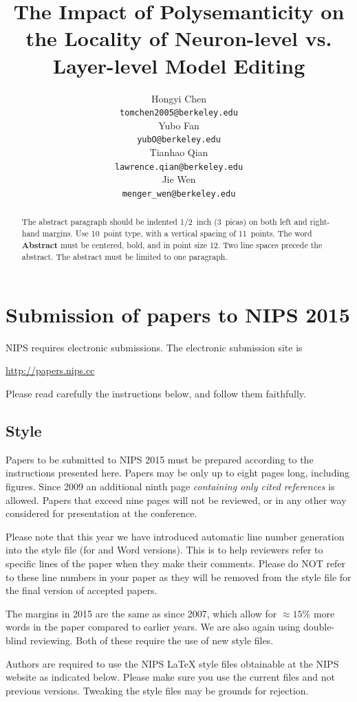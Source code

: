 \documentclass{article} %
\title{The Impact of Polysemanticity on the Locality of Neuron-level vs. Layer-level Model Editing}
\author{
Hongyi Chen \\
\texttt{tomchen2005@berkeley.edu} \\
\And
Yubo Fan \\
\texttt{yubO@berkeley.edu} \\
\AND
Tianhao Qian \\
\texttt{lawrence.qian@berkeley.edu} \\
\And
Jie Wen \\
\texttt{menger_wen@berkeley.edu} \\
}
\begin{document}
\maketitle

\begin{abstract}
The abstract paragraph should be indented 1/2~inch (3~picas) on both left and
right-hand margins. Use 10~point type, with a vertical spacing of 11~points.
The word \textbf{Abstract} must be centered, bold, and in point size 12. Two
line spaces precede the abstract. The abstract must be limited to one
paragraph.
\end{abstract}

\section{Submission of papers to NIPS 2015}

NIPS requires electronic submissions.  The electronic submission site is  
\begin{center}
   \url{http://papers.nips.cc}
\end{center}

Please read carefully the
instructions below, and follow them faithfully.
\subsection{Style}

Papers to be submitted to NIPS 2015 must be prepared according to the
instructions presented here. Papers may be only up to eight pages long,
including figures. Since 2009 an additional ninth page \textit{containing only
cited references} is allowed. Papers that exceed nine pages will not be
reviewed, or in any other way considered for presentation at the conference.

Please note that this year we have introduced automatic line number generation
into the style file (for \LaTeXe and Word versions). This is to help reviewers
refer to specific lines of the paper when they make their comments. Please do
NOT refer to these line numbers in your paper as they will be removed from the
style file for the final version of accepted papers.

The margins in 2015 are the same as since 2007, which allow for $\approx 15\%$
more words in the paper compared to earlier years. We are also again using 
double-blind reviewing. Both of these require the use of new style files.

Authors are required to use the NIPS \LaTeX{} style files obtainable at the
NIPS website as indicated below. Please make sure you use the current files and
not previous versions. Tweaking the style files may be grounds for rejection.
\end{document}
